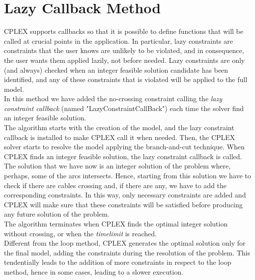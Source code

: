 \section{Lazy Callback Method}
\textsc{CPLEX} supports callbacks so that it is possible to define functions that will be called at crucial points in the application. In particular, lazy constraints are constraints that the user knows are unlikely to be violated, and in consequence, the user
wants them applied lazily, not before needed. Lazy constraints are only (and always) checked when an integer feasible solution candidate has been identified, and any of these constraints that is violated will be applied to the full model. \\
In this method we have added the no-crossing constraint calling the \textit{lazy constraint callback} (named "LazyConstraintCallBack") each time the solver find an integer feasible solution. \\
The algorithm starts with the creation of the model, and the lazy constraint callback is installed to make \textsc{CPLEX} call it when needed. Then, the \textsc{CPLEX} solver starts to resolve the model applying the branch-and-cut technique. When \textsc{CPLEX} finds an integer feasible solution, the lazy constraint callback is called. The solution that we have now is an integer solution of the problem where, perhaps, some of
the arcs intersects. Hence, starting from this solution we have to check if there are cables crossing and, if there are any, we have to add the corresponding constraints. In this way, only necessary constraints are added and \textsc{CPLEX} will make sure that these constraints will be satisfied before producing any future solution of the problem.\\
The algorithm terminates when \textsc{CPLEX} finds the optimal integer solution without crossing, or when the \textit{timelimit} is reached. \\
Different from the loop method, \textsc{CPLEX} generates the optimal solution only for the final model, adding the constraints during the resolution of the problem. This tendentially leads to the addition of more constraints in respect to the loop method, hence in some cases, leading to a slower execution.

